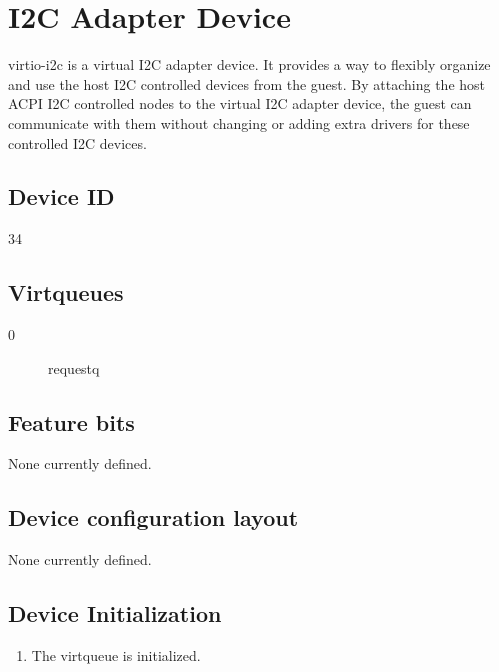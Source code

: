 \section{I2C Adapter Device}\label{sec:Device Types / I2C Adapter Device}

virtio-i2c is a virtual I2C adapter device. It provides a way to flexibly
organize and use the host I2C controlled devices from the guest. By attaching
the host ACPI I2C controlled nodes to the virtual I2C adapter device, the guest can
communicate with them without changing or adding extra drivers for these
controlled I2C devices.

\subsection{Device ID}\label{sec:Device Types / I2C Adapter Device / Device ID}
34

\subsection{Virtqueues}\label{sec:Device Types / I2C Adapter Device / Virtqueues}

\begin{description}
\item[0] requestq
\end{description}

\subsection{Feature bits}\label{sec:Device Types / I2C Adapter Device / Feature bits}

None currently defined.

\subsection{Device configuration layout}\label{sec:Device Types / I2C Adapter Device / Device configuration layout}

None currently defined.

\subsection{Device Initialization}\label{sec:Device Types / I2C Adapter Device / Device Initialization}

\begin{enumerate}
\item The virtqueue is initialized.
\end{enumerate}

